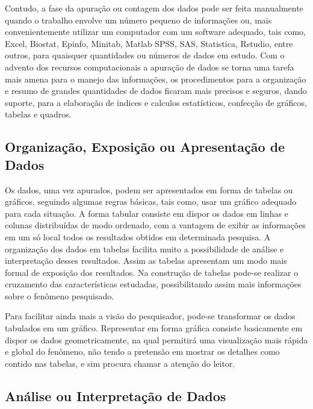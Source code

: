 Contudo, a fase da apuração ou contagem dos dados pode ser feita manualmente quando o trabalho envolve um número pequeno de
informações ou, mais convenientemente utilizar um computador com
um software adequado, tais como, Excel, Biostat, Epinfo, Minitab, Matlab
SPSS, SAS, Statistica, Rstudio, entre outros, para quaisquer quantidades ou números de
dados em estudo. Com o advento dos recursos computacionais a
apuração de dados se torna uma tarefa mais amena para o manejo das
informações, os procedimentos para a organização e resumo de
grandes quantidades de dados ficaram mais precisos e seguros,
dando suporte, para a elaboração de indices e calculos
estatísticos, confecção de gráficos, tabelas e quadros.



\subsection{Organização, Exposição ou Apresentação de Dados}

\inic Os dados, uma vez apurados, podem ser apresentados em forma
de tabelas ou gráficos, seguindo algumas regras básicas,
tais como, usar um gráfico adequado para cada situação. A forma
tabular consiste em dispor os dados em linhas e colunas
distribuídas de modo ordenado, com a vantagem de exibir as
informações em um só local todos os resultados obtidos em
determinada pesquisa. A organização dos dados em tabelas facilita
muito a possibilidade de análise e interpretação desses
resultados. Assim as tabelas apresentam um modo mais formal de
exposição dos resultados. Na construção de tabelas pode-se
realizar o cruzamento das características estudadas,
possibilitando assim mais informações sobre o fenômeno
pesquisado.\vskip0.3cm

\inic Para facilitar ainda mais a visão do
pesquisador, pode-se transformar os dados
tabulados em um gráfico. Representar em forma
gráfica consiste basicamente em dispor os dados
geometricamente, na qual permitirá uma visualização
mais rápida e global do fenômeno, não tendo a pretensão
em mostrar os detalhes como contido nas tabelas, e sim
procura chamar a atenção do leitor.\vskip0.3cm


\subsection{Análise ou Interpretação de Dados}

